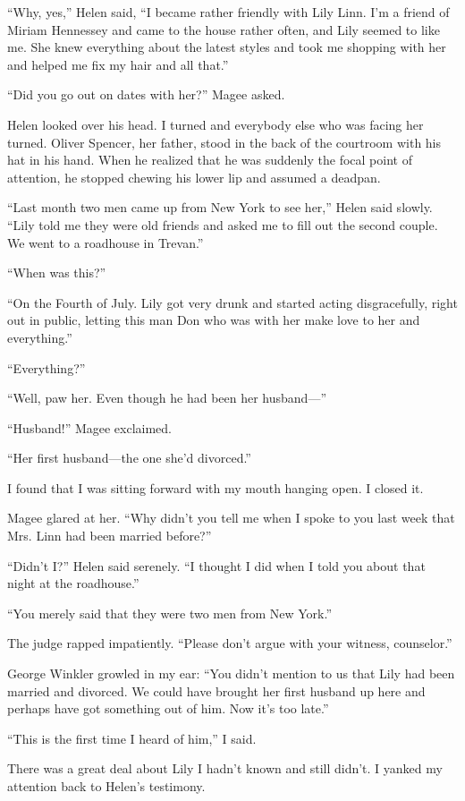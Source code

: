 \documentclass{novel}
\begin{document}
“Why, yes,” Helen said, “I became rather friendly with Lily Linn. I’m a friend of Miriam Hennessey and came to the house rather often, and Lily seemed to like me. She knew everything about the latest styles and took me shopping with her and helped me fix my hair and all that.”

“Did you go out on dates with her?” Magee asked.

Helen looked over his head. I turned and everybody else who was facing her turned. Oliver Spencer, her father, stood in the back of the courtroom with his hat in his hand. When he realized that he was suddenly the focal point of attention, he stopped chewing his lower lip and assumed a deadpan.

“Last month two men came up from New York to see her,” Helen said slowly. “Lily told me they were old friends and asked me to fill out the second couple. We went to a roadhouse in Trevan.”

“When was this?”

“On the Fourth of July. Lily got very drunk and started acting disgracefully, right out in public, letting this man Don who was with her make love to her and everything.”

“Everything?”

“Well, paw her. Even though he had been her husband—”

“Husband!” Magee exclaimed.

“Her first husband—the one she’d divorced.”

I found that I was sitting forward with my mouth hanging open. I closed it.

Magee glared at her. “Why didn’t you tell me when I spoke to you last week that Mrs. Linn had been married before?”

“Didn’t I?” Helen said serenely. “I thought I did when I told you about that night at the roadhouse.”

“You merely said that they were two men from New York.”

The judge rapped impatiently. “Please don’t argue with your witness, counselor.”

George Winkler growled in my ear: “You didn’t mention to us that Lily had been married and divorced. We could have brought her first husband up here and perhaps have got something out of him. Now it’s too late.”

“This is the first time I heard of him,” I said.

There was a great deal about Lily I hadn’t known and still didn’t. I yanked my attention back to Helen’s testimony.
\end{document}
